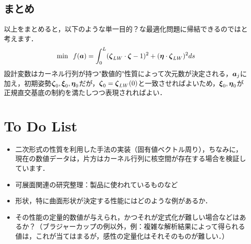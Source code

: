 \documentclass[11pt]{jsarticle}
\begin{document}
		\subsection{まとめ}
		以上をまとめると，以下のような単一目的？な最適化問題に帰結できるのではと考えます．
		\begin{eqnarray}
			\min \;\; f(\boldsymbol{a}) = \int_{0}^{L} (\boldsymbol{\zeta}_{LW} \cdot \boldsymbol{\zeta} -1 )^2 + (\boldsymbol{\eta} \cdot \boldsymbol{\zeta}_{LW})^2 ds
		\end{eqnarray}
		設計変数はカーネル行列が持つ"数値的"性質によって次元数が決定される，$ \boldsymbol{a}_j$に加え，初期姿勢$ \boldsymbol{\zeta}_0,\boldsymbol{\xi}_0,\boldsymbol{\eta}_0 $だが，$ \boldsymbol{\zeta}_0 = \boldsymbol{\zeta}_{LW}(0) $と一致させればよいため，$ \boldsymbol{\xi}_0,\boldsymbol{\eta}_0 $が正規直交基底の制約を満たしつつ表現されればよい．
	\section{To Do List}
		\begin{itemize}
			\item 二次形式の性質を利用した手法の実装（固有値ベクトル周り），ちなみに，現在の数値データは，片方はカーネル行列に核空間が存在する場合を検証しています．
			\item 可展面関連の研究整理：製品に使われているものなど
			\item 形状，特に曲面形状が決定する性能にはどのような例があるか．
			\item その性能の定量的数値が与えられ，かつそれが定式化が難しい場合などはあるか？（ブラジャーカップの例以外，例：複雑な解析結果によって得られる値は，これが当てはまるが，感性の定量化はそれそのものが難しい．）
			
		\end{itemize}
				
	\newpage
\vspace{10cm}
	

\vspace{14cm}
	\articleSPRfour
	\articleSPRfive
\end{document}
